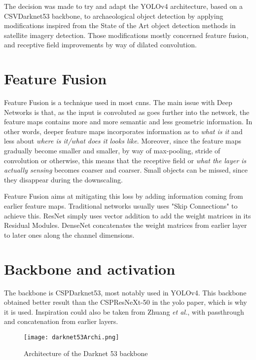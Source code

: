 The decision was made to try and adapt the YOLOv4\cite{yolov4} architecture, based on a CSVDarknet53 backbone, to archaeological object detection by applying modifications inspired from the State of the Art object detection methods in satellite imagery detection. Those modifications mostly concerned feature fusion, and receptive field improvements by way of dilated convolution.

\section{Feature Fusion}
Feature Fusion is a technique used in most \glspl{cnn}. The main issue with Deep Networks is that, as the input is convoluted as goes further into the network, the feature maps contains more and more semantic and less geometric information. In other words, deeper feature maps incorporates information as to \textit{what is it} and less about \textit{where is it/what does it looks like}. Moreover, since the feature maps gradually become smaller and smaller, by way of max-pooling, stride of convolution or otherwise, this means that the receptive field or \textit{what the layer is actually sensing} becomes coarser and coarser. Small objects can be missed, since they disappear during the downscaling.

Feature Fusion aims at mitigating this loss by adding information coming from earlier feature maps. Traditional networks usually uses "Skip Connections" to achieve this. ResNet\cite{resNet} simply uses vector addition to add the weight matrices in its Residual Modules. DenseNet\cite{denseNet} concatenates the weight matrices from earlier layer to later ones along the channel dimensions.

\section{Backbone and activation}
The backbone is CSPDarknet53\cite{CSPDarknet53}, most notably used in YOLOv4\cite{yolov4}. This backbone obtained better result than the CSPResNeXt-50\cite{resNeXt} in the \gls{yolo} paper, which is why it is used. Inspiration could also be taken from Zhuang \textit{et al.}\cite{zhuang2019}, with passthrough and concatenation from earlier layers.

\begin{figure}[H]
	\centering
	\texttt{[image: darknet53Archi.png]}
	\caption[]{Architecture of the Darknet 53 backbone}
	\label{}
\end{figure}

